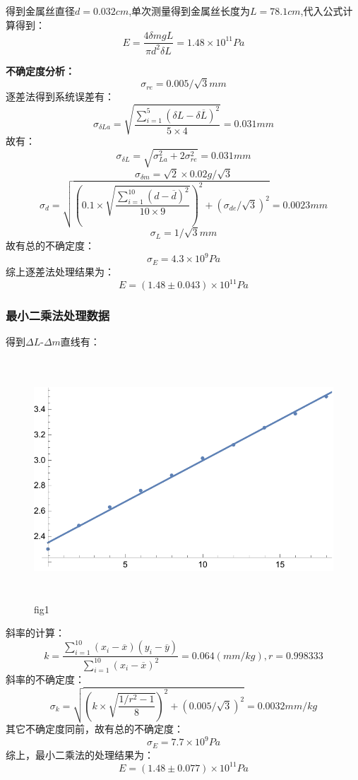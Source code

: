 \documentclass[a4paper, 10pt]{article}
\begin{document}
\noindent 得到金属丝直径$d=0.032cm$,单次测量得到金属丝长度为$L=78.1cm$,代入公式计算得到：
$$E=\frac{4\delta mgL}{\pi d^2\delta L}=1.48\times 10^{11}Pa$$

\vspace{10pt}
\noindent \textbf{不确定度分析：}
$$\sigma_{re}=0.005/\sqrt{3}mm$$
逐差法得到系统误差有：
$$\sigma_{\delta La}=\sqrt{\frac{\sum_{i=1}^5(\delta L-\delta \overline{L})^2}{5\times 4}}=0.031mm$$
故有：
$$\sigma_{\delta L}=\sqrt{\sigma_{La}^2+2\sigma_{re}^2}=0.031mm$$
$$\sigma_{\delta m}=\sqrt{2}\times0.02g/\sqrt{3}$$
$$\sigma_d=\sqrt{(0.1\times\sqrt{\frac{\sum_{i=1}^{10}(d-\overline{d})^2}{10\times 9}})^2+(\sigma_{de}/\sqrt{3})^2}=0.0023mm$$
$$\sigma_L=1/\sqrt{3}mm$$
故有总的不确定度：
$$\sigma_E=4.3\times10^9Pa$$
综上逐差法处理结果为：
$$E=(1.48\pm 0.043)\times10^{11}Pa$$
\subsubsection{最小二乘法处理数据}
\noindent 得到$\Delta L$-$\Delta m$直线有：

\vspace{10pt}
\begin{figure}[ht]
    \centering 
    \includegraphics[height=9cm,width=13.5cm]{fg.pdf}
    
    \caption{fig1}
    \label{1}
    
    \end{figure}

\noindent 斜率的计算：
$$k=\frac{\sum_{i=1}^{10}(x_i-\overline{x})(y_i-\overline{y})}{\sum_{i=1}^{10}(x_i-\overline{x})^2}=0.064(mm/kg),r=0.998333$$
斜率的不确定度：
$$\sigma_{k}=\sqrt{(k\times\sqrt{\frac{1/r^2-1}{8}})^2+(0.005/\sqrt{3})^2}=0.0032mm/kg$$
其它不确定度同前，故有总的不确定度：
$$\sigma_E=7.7\times 10^9Pa$$
综上，最小二乘法的处理结果为：
$$E=(1.48\pm 0.077)\times10^{11}Pa$$
\end{document}
